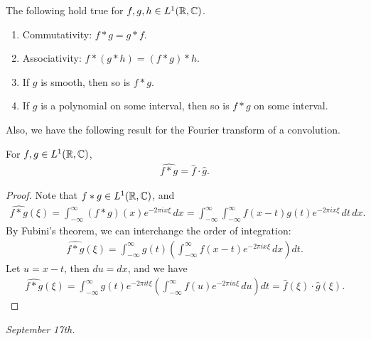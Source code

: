 \begin{proposition}
    The following hold true for $f,g,h \in L^{1}(\mathbb{R},\mathbb{C})$.
    \begin{enumerate}
        \item Commutativity: $f * g = g * f$.
        \item Associativity: $f * (g * h) = (f * g) * h$.
        \item If $g$ is smooth, then so is $f * g$.
        \item If $g$ is a polynomial on some interval, then so is $f * g$ on some interval.
    \end{enumerate}
\end{proposition}

Also, we have the following result for the Fourier transform of a convolution.
\begin{proposition}
    For $f,g \in L^{1}(\mathbb{R},\mathbb{C})$,
    \begin{align}
        \widehat{f * g} = \hat{f} \cdot \hat{g}.
    \end{align}
\end{proposition}
\begin{proof}
    Note that $f * g \in L^{1}(\mathbb{R},\mathbb{C})$, and
    \begin{align}
        \widehat{f * g}(\xi) = \int_{-\infty}^{\infty} (f * g)(x) e^{-2\pi i x \xi} \, dx = \int_{-\infty}^{\infty} \int_{-\infty}^{\infty} f(x-t)g(t) e^{-2\pi i x \xi} \, dt \, dx.
    \end{align}
    By Fubini's theorem, we can interchange the order of integration:
    \begin{align}
        \widehat{f * g}(\xi) = \int_{-\infty}^{\infty} g(t) \left( \int_{-\infty}^{\infty} f(x-t) e^{-2\pi i x \xi} \, dx \right) dt.
    \end{align}
    Let $u = x - t$, then $du = dx$, and we have
    \begin{align}
        \widehat{f * g}(\xi) = \int_{-\infty}^{\infty} g(t) e^{-2\pi i t \xi} \left( \int_{-\infty}^{\infty} f(u) e^{-2\pi i u \xi} \, du \right) dt = \hat{f}(\xi) \cdot \hat{g}(\xi).
    \end{align}
\end{proof}

\textit{September 17th.}

